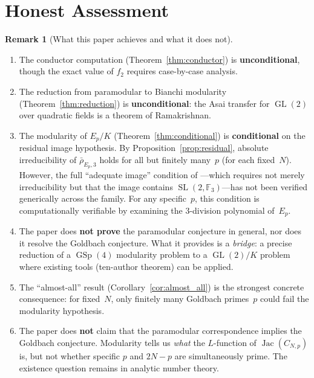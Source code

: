 \documentclass[11pt,a4paper]{article}
\theoremstyle{definition}
\newtheorem{remark}[theorem]{Remark}
\DeclareMathOperator{\GL}{GL}
\DeclareMathOperator{\SL}{SL}
\DeclareMathOperator{\GSp}{GSp}
\DeclareMathOperator{\Jac}{Jac}
\begin{document}
\section{Honest Assessment}\label{sec:honest}

\begin{remark}[What this paper achieves and what it does not]\label{rem:final_honest}
\begin{enumerate}
    \item[\textup{(a)}] The conductor computation (Theorem~\ref{thm:conductor}) is \textbf{unconditional}, though the exact value of $f_2$ requires case-by-case analysis.
    \item[\textup{(b)}] The reduction from paramodular to Bianchi modularity (Theorem~\ref{thm:reduction}) is \textbf{unconditional}: the Asai transfer for $\GL(2)$ over quadratic fields is a theorem of Ramakrishnan.
    \item[\textup{(c)}] The modularity of $E_p/K$ (Theorem~\ref{thm:conditional}) is \textbf{conditional} on the residual image hypothesis. By Proposition~\ref{prop:residual}, absolute irreducibility of $\bar{\rho}_{E_p,3}$ holds for all but finitely many~$p$ (for each fixed~$N$). However, the full ``adequate image'' condition of \cite{TenAuthor}---which requires not merely irreducibility but that the image contains $\SL(2, \mathbb{F}_3)$---has not been verified generically across the family. For any specific~$p$, this condition is computationally verifiable by examining the $3$-division polynomial of~$E_p$.
    \item[\textup{(d)}] The paper does \textbf{not prove} the paramodular conjecture in general, nor does it resolve the Goldbach conjecture. What it provides is a \emph{bridge}: a precise reduction of a $\GSp(4)$ modularity problem to a $\GL(2)/K$ problem where existing tools (ten-author theorem) can be applied.
    \item[\textup{(e)}] The ``almost-all'' result (Corollary~\ref{cor:almost_all}) is the strongest concrete consequence: for fixed~$N$, only finitely many Goldbach primes~$p$ could fail the modularity hypothesis.
    \item[\textup{(f)}] The paper does \textbf{not} claim that the paramodular correspondence implies the Goldbach conjecture. Modularity tells us \emph{what} the $L$-function of $\Jac(C_{N,p})$ is, but not whether specific $p$ and $2N-p$ are simultaneously prime. The existence question remains in analytic number theory.
\end{enumerate}
\end{remark}
\end{document}
